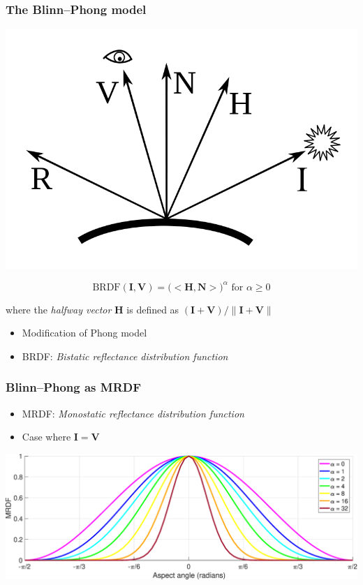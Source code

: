 \documentclass{beamer}
\begin{document}
\begin{frame}[t]
\frametitle{The Blinn--Phong model}
\centerline{\includegraphics[scale=0.22]{./figs/ModelVectors}}
$$\text{BRDF}(\mathbf{I},\mathbf{V}) = \big(<\mathbf{H},\mathbf{N}>\big)^\alpha \text{ for } \alpha \geq 0$$
\centerline{where the \textit{halfway vector} $\mathbf{H}$ is defined as $(\mathbf{I} + \mathbf{V})/\|\mathbf{I} + \mathbf{V}\|$}
\begin{itemize}
\item Modification of Phong model
\item BRDF: \textit{Bistatic reflectance distribution function}
\end{itemize}
\end{frame}

\begin{frame}[t]
\frametitle{Blinn--Phong as MRDF}
\begin{itemize}
\item MRDF: \textit{Monostatic reflectance distribution function}
\item Case where $\mathbf{I} = \mathbf{V}$
\end{itemize}
\centerline{\includegraphics[scale=0.3]{./figs/MRDFs}}
\end{frame}
\end{document}
